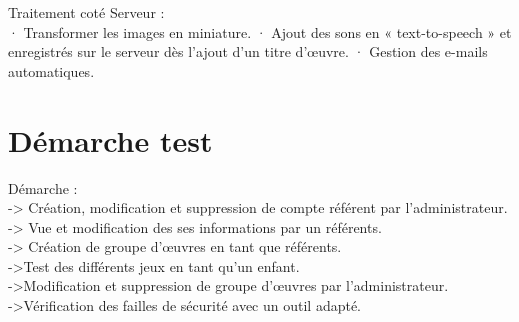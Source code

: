 \documentclass[12pt,a4paper]{report}
\begin{document}
Traitement coté Serveur :\\
·         Transformer les images en miniature.
·         Ajout des sons en « text-to-speech » et enregistrés sur le serveur dès l’ajout d’un titre d’œuvre.
·         Gestion des e-mails automatiques.

\chapter{Démarche test}
Démarche : \\
-> Création, modification et suppression de compte référent par l'administrateur.\\
-> Vue et modification des ses informations par un référents.\\
-> Création de groupe d'œuvres en tant que référents. \\
->Test des différents jeux en tant qu’un enfant.\\
->Modification et suppression de groupe d'œuvres par l'administrateur.\\
->Vérification des failles de sécurité avec un outil adapté.
\end{document}
